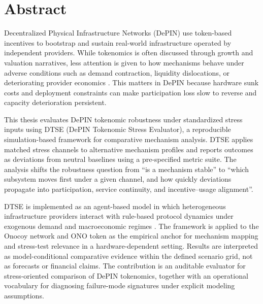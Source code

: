 \documentclass[12pt,a4paper]{article}
\begin{document}
\section*{Abstract}
{}
Decentralized Physical Infrastructure Networks (DePIN) use token-based incentives to bootstrap and sustain real-world infrastructure operated by independent providers. While tokenomics is often discussed through growth and valuation narratives, less attention is given to how mechanisms behave under adverse conditions such as demand contraction, liquidity dislocations, or deteriorating provider economics \cite{Messari2024, FrontiersDePIN2025}. This matters in DePIN because hardware sunk costs and deployment constraints can make participation loss slow to reverse and capacity deterioration persistent.

This thesis evaluates DePIN tokenomic robustness under standardized stress inputs using DTSE (DePIN Tokenomic Stress Evaluator), a reproducible simulation-based framework for comparative mechanism analysis. DTSE applies matched stress channels to alternative mechanism profiles and reports outcomes as deviations from neutral baselines using a pre-specified metric suite. The analysis shifts the robustness question from ``is a mechanism stable'' to ``which subsystem moves first under a given channel, and how quickly deviations propagate into participation, service continuity, and incentive--usage alignment''.

DTSE is implemented as an agent-based model in which heterogeneous infrastructure providers interact with rule-based protocol dynamics under exogenous demand and macroeconomic regimes \cite{Morris2019, Braakman2022}. The framework is applied to the Onocoy network and ONO token as the empirical anchor for mechanism mapping and stress-test relevance in a hardware-dependent setting. Results are interpreted as model-conditional comparative evidence within the defined scenario grid, not as forecasts or financial claims. The contribution is an auditable evaluator for stress-oriented comparison of DePIN tokenomics, together with an operational vocabulary for diagnosing failure-mode signatures under explicit modeling assumptions.
\vspace{1cm}

\clearpage

\tableofcontents
\clearpage

{}
\listoffigures
\end{document}
